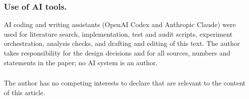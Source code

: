 \begin{credits}
\subsubsection{Use of AI tools.}
AI coding and writing assistants (OpenAI Codex and Anthropic Claude) were used for
literature search, implementation, test and audit scripts, experiment orchestration,
analysis checks, and drafting and editing of this text. The author takes
responsibility for the design decisions and for all sources, numbers and statements
in the paper; no AI system is an author.

\subsubsection{\discintname}
The author has no competing interests to declare that are relevant to the content
of this article.
\end{credits}
